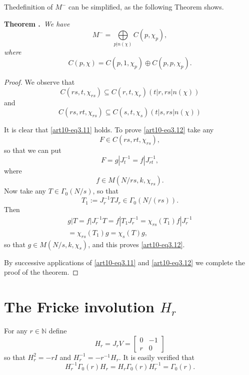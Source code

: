 The\pageoriginale definition of $M^{-}$ can be simplified, as the following Theorem shows.

\medskip
\noindent
{\bf Theorem .\label{art10-thm3.1}}~{\em We have}
\begin{equation}
M^{-}=\bigoplus\limits_{p|n(\chi)}C(p,\chi_{p}),\label{art10-eq3.9}
\end{equation}
{\em where}
\begin{equation}
C(p,\chi)=C(p,1,\chi_{p})\oplus C(p,p,\chi_{p}).\label{art10-eq3.10}
\end{equation}

\begin{proof}
We observe that
\begin{equation}
C(rs,t,\chi_{rs})\subseteq C(r,t,\chi_{r})(t|r,rs|n(\chi))\label{art10-eq3.11}
\end{equation}
and
\begin{equation}
C(rs,rt,\chi_{rs})\subseteq C(s,t,\chi_{s})(t|s,rs|n(\chi))\label{art10-eq3.12}
\end{equation}

It is clear that \eqref{art10-eq3.11} holds. To prove \eqref{art10-eq3.12} take any 
$$
F\in C(rs,rt,\chi_{rs}),
$$ 
so that we can put
$$
F=g|J^{-1}_{t}=f|J^{-1}_{rt},
$$
where
$$
f\in M(N/rs,k,\chi_{rs}).
$$
Now take any $T\in\Gamma_{0}(N/s)$, so that
$$
T_{1}:=J^{-1}_{r}TJ_{r}\in \Gamma_{0}(N/(rs)).
$$
Then
\begin{gather*}
g|T=f|J^{-1}_{r}T=f|T_{1}J^{-1}_{r}=\chi_{rs}(T_{1})f|J^{-1}_{r}\\
=\chi_{rs}(T_{1})g=\chi_{s}(T)g,
\end{gather*}
so that $g\in M(N/s,k,\chi_{s})$, and this proves \eqref{art10-eq3.12}.

By successive applications of \eqref{art10-eq3.11} and \eqref{art10-eq3.12} we complete the proof of the theorem.
\end{proof}

\section{The Fricke involution \texorpdfstring{$H_{r}$}{Hr}}\label{art10-sec4}
For any $r\in \mathbb{N}$ define
\setcounter{equation}{0}
\begin{equation}
H_{r}=J_{r}V=
\begin{bmatrix}
0 & -1\\
r & 0
\end{bmatrix}\label{art10-eq4.1}
\end{equation}
so that $H^{2}_{r}=-rI$ and $H^{-1}_{r}=-r^{-1}H_{r}$. It is easily verified that
\begin{equation}
H^{-1}_{r}\Gamma_{0}(r)H_{r}=H_{r}\Gamma_{0}(r)H^{-1}_{r}=\Gamma_{0}(r).\label{art10-eq4.2}
\end{equation}

